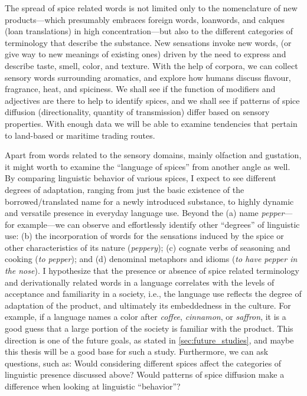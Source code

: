 The spread of spice related words is not limited only to the nomenclature of new products---which presumably embraces foreign words, loanwords, and calques (loan translations) in high concentration---but also to the different categories of terminology that describe the substance. New sensations invoke new words, (or give way to new meanings of existing ones) driven by the need to express and describe taste, smell, color, and texture. With the help of corpora, we can collect sensory words surrounding aromatics, and explore how humans discuss flavour, fragrance, heat, and spiciness. We shall see if the function of modifiers and adjectives are there to help to identify spices, and we shall see if patterns of spice diffusion (directionality, quantity of transmission) differ based on sensory properties. With enough data we will be able to examine tendencies that pertain to land-based or maritime trading routes.

Apart from words related to the sensory domains, mainly olfaction and gustation, it might worth to examine the ``language of spices'' from another angle as well. By comparing linguistic behavior of various spices, I expect to see different degrees of adaptation, ranging from just the basic existence of the borrowed/translated name for a newly introduced substance, to highly dynamic and versatile presence in everyday language use. Beyond the (a) name \textit{pepper}---for example---we can observe and effortlessly identify other ``degrees'' of linguistic use: (b) the incorporation of words for the sensations induced by the spice or other characteristics of its nature (\textit{peppery}); (c) cognate verbs of seasoning and cooking (\textit{to pepper}); and (d) denominal metaphors and idioms (\textit{to have pepper in the nose}). I hypothesize that the presence or absence of spice related terminology and derivationally related words in a language correlates with the levels of acceptance and familiarity in a society, i.e., the language use reflects the degree of adaptation of the product, and ultimately its embeddedness in the culture. For example, if a language names a color after \textit{coffee}, \textit{cinnamon}, or \textit{saffron}, it is a good guess that a large portion of the society is familiar with the product. This direction is one of the future goals, as stated in \cref{sec:future_studies}, and maybe this thesis will be a good base for such a study. Furthermore, we can ask questions, such as: Would considering different spices affect the categories of linguistic presence discussed above? Would patterns of spice diffusion make a difference when looking at linguistic ``behavior''?

